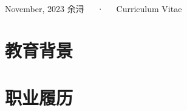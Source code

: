 \documentclass[11pt,a4paper,]{awesome-cv}
\begin{document}
\makecvheader

\makecvfooter
  {November, 2023}
    {余浔~~~·~~~Curriculum Vitae}
  {\thepage}





\hypertarget{ux6559ux80b2ux80ccux666f}{%
\section{教育背景}\label{ux6559ux80b2ux80ccux666f}}

\begin{cventries}
    \vspace{-4.0mm}
    \vspace{-4.0mm}
\end{cventries}

\hypertarget{ux804cux4e1aux5c65ux5386}{%
\section{职业履历}\label{ux804cux4e1aux5c65ux5386}}
\end{document}
